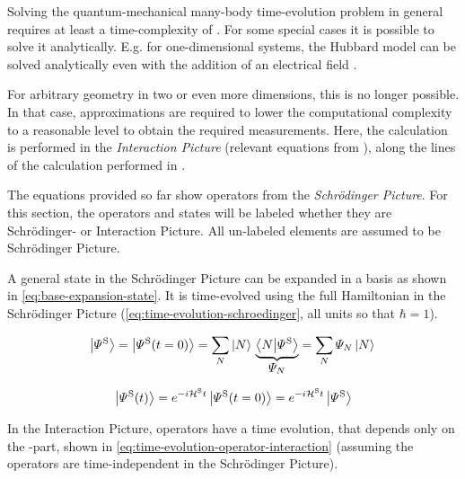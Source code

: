 Solving the quantum-mechanical many-body time-evolution problem in general requires at least a time-complexity of .
For some special cases it is possible to solve it analytically.
E.g. for one-dimensional systems, the Hubbard model can be solved analytically even with the addition of an electrical field \cite{exactSolutionExampleHubbardEvenElectricalField}.

For arbitrary geometry in two or even more dimensions, this is no longer possible.
In that case, approximations are required to lower the computational complexity to a reasonable level to obtain the required measurements.
Here, the calculation is performed in the \emph{Interaction Picture} (relevant equations from \cite{schwablBook}), along the lines of the calculation performed in \cite{variationalClassicalNetworksPaper}.

The equations provided so far show operators from the \emph{Schrödinger Picture}. 
For this section, the operators and states will be labeled whether they are Schrödinger- or Interaction Picture. All un-labeled elements are assumed to be Schrödinger Picture.

A general state in the Schrödinger Picture can be expanded in a basis as shown in \autoref{eq:base-expansion-state}. It is time-evolved using the full Hamiltonian in the Schrödinger Picture (\autoref{eq:time-evolution-schroedinger}, all units so that $\hbar = 1$).

\begin{equation}
    \label{eq:base-expansion-state}
    \ketpsi[\schroedingerPicture]{} = \ketpsiof[\schroedingerPicture]{t=0} = 
    \lsum[N] \ketN{}\underbrace{\braketHelper{N}{\picturePsi[\schroedingerPicture]{}}}_{\text{\normalsize\psiN}} = \lsum[N] \psiN \ketN{}
\end{equation}

\begin{equation}
    \label{eq:time-evolution-schroedinger}
    \ketpsiof[\schroedingerPicture]{t} = e^{-i \pictureHamiltonian[\schroedingerPicture] t} \ketpsiof[\schroedingerPicture]{t=0} = e^{-i \pictureHamiltonian[\schroedingerPicture] t} \ketpsi[\schroedingerPicture]{}
\end{equation}

In the Interaction Picture, operators have a time evolution, that depends only on the \HzeroHamiltonian[\schroedingerPicture]{}-part, shown in \autoref{eq:time-evolution-operator-interaction} (assuming the operators are time-independent in the Schrödinger Picture). 

